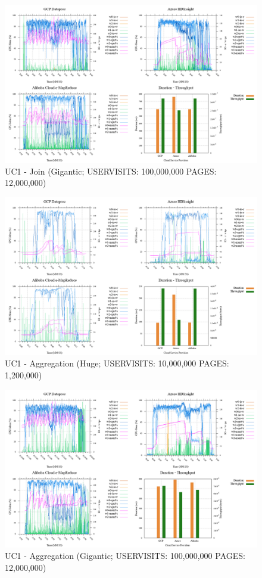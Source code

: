 \documentclass[review]{elsarticle}
\begin{document}
\begin{figure}[b]
	\caption{UC1 - Join (Gigantic; USERVISITS: 100,000,000 PAGES: 12,000,000)}
	\label{fig:uc1-join-g-cmidt}
	\includegraphics[width=\textwidth]{uc1-join-g-cmidt}
	\centering
\end{figure}

\begin{figure}[b]
	\caption{UC1 - Aggregation (Huge; USERVISITS: 10,000,000 PAGES: 1,200,000)}
	\label{fig:uc1-aggreg-h-cmidt}
	\includegraphics[width=\textwidth]{uc1-aggreg-h-cmidt}
	\centering
\end{figure}

\begin{figure}[b]
	\caption{UC1 - Aggregation (Gigantic; USERVISITS: 100,000,000 PAGES: 12,000,000)}
	\label{fig:uc1-aggreg-g-cmidt}
	\includegraphics[width=\textwidth]{uc1-aggreg-g-cmidt}
	\centering
\end{figure}
\end{document}
